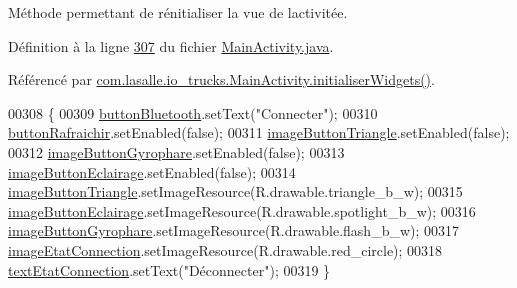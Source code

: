 Méthode permettant de rénitialiser la vue de l\textquotesingle{}activitée. 



Définition à la ligne \hyperlink{_main_activity_8java_source_l00307}{307} du fichier \hyperlink{_main_activity_8java_source}{Main\+Activity.\+java}.



Référencé par \hyperlink{_main_activity_8java_source_l00272}{com.\+lasalle.\+io\+\_\+trucks.\+Main\+Activity.\+initialiser\+Widgets()}.


\begin{DoxyCode}
00308     \{
00309         \hyperlink{classcom_1_1lasalle_1_1io__trucks_1_1_main_activity_a2197b0145db353437c41d1fc57f28650}{buttonBluetooth}.setText(\textcolor{stringliteral}{"Connecter"});
00310         \hyperlink{classcom_1_1lasalle_1_1io__trucks_1_1_main_activity_ac138932ce8d8dd12d7eb35496a1c9a16}{buttonRafraichir}.setEnabled(\textcolor{keyword}{false});
00311         \hyperlink{classcom_1_1lasalle_1_1io__trucks_1_1_main_activity_abe65c5762df1b63ee18b51fcb1bb23c8}{imageButtonTriangle}.setEnabled(\textcolor{keyword}{false});
00312         \hyperlink{classcom_1_1lasalle_1_1io__trucks_1_1_main_activity_aed3dc707e8acf48e821ebda3312a0dca}{imageButtonGyrophare}.setEnabled(\textcolor{keyword}{false});
00313         \hyperlink{classcom_1_1lasalle_1_1io__trucks_1_1_main_activity_a1cc3f48aebca6c187b2a964fa6f569fc}{imageButtonEclairage}.setEnabled(\textcolor{keyword}{false});
00314         \hyperlink{classcom_1_1lasalle_1_1io__trucks_1_1_main_activity_abe65c5762df1b63ee18b51fcb1bb23c8}{imageButtonTriangle}.setImageResource(R.drawable.triangle\_b\_w);
00315         \hyperlink{classcom_1_1lasalle_1_1io__trucks_1_1_main_activity_a1cc3f48aebca6c187b2a964fa6f569fc}{imageButtonEclairage}.setImageResource(R.drawable.spotlight\_b\_w);
00316         \hyperlink{classcom_1_1lasalle_1_1io__trucks_1_1_main_activity_aed3dc707e8acf48e821ebda3312a0dca}{imageButtonGyrophare}.setImageResource(R.drawable.flash\_b\_w);
00317         \hyperlink{classcom_1_1lasalle_1_1io__trucks_1_1_main_activity_aa9d2b0a05a522c372879d3c35294d7bc}{imageEtatConnection}.setImageResource(R.drawable.red\_circle);
00318         \hyperlink{classcom_1_1lasalle_1_1io__trucks_1_1_main_activity_a62ce189c543dda03ed48e00c10623677}{textEtatConnection}.setText(\textcolor{stringliteral}{"Déconnecter"});
00319     \}
\end{DoxyCode}
\mbox{\label{classcom_1_1lasalle_1_1io__trucks_1_1_main_activity_a2088afcfce1e8adcf35fe6b79d63887a}} 
